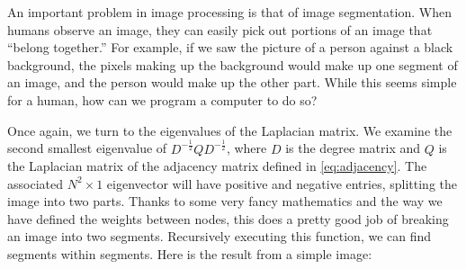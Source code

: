 
An important problem in image processing is that of image segmentation.  When humans observe an image, they can easily pick out portions of an image that ``belong together.''  For example, if we saw the picture of a person against a black background, the pixels making up the background would make up one segment of an image, and the person would make up the other part.  While this seems simple for a human, how can we program a computer to do so?

Once again, we turn to the eigenvalues of the Laplacian matrix.  We examine the second smallest eigenvalue of $D^{-\frac{1}{2}}QD^{-\frac{1}{2}}$, where $D$ is the degree matrix and $Q$ is the Laplacian matrix of the adjacency matrix defined in \eqref{eq:adjacency}.  The associated $N^2 \times 1$ eigenvector will have positive and negative entries, splitting the image into two parts.  Thanks to some very fancy mathematics and the way we have defined the weights between nodes, this does a pretty good job of breaking an image into two segments.  Recursively executing this function, we can find segments within segments.  Here is the result from a simple image:

